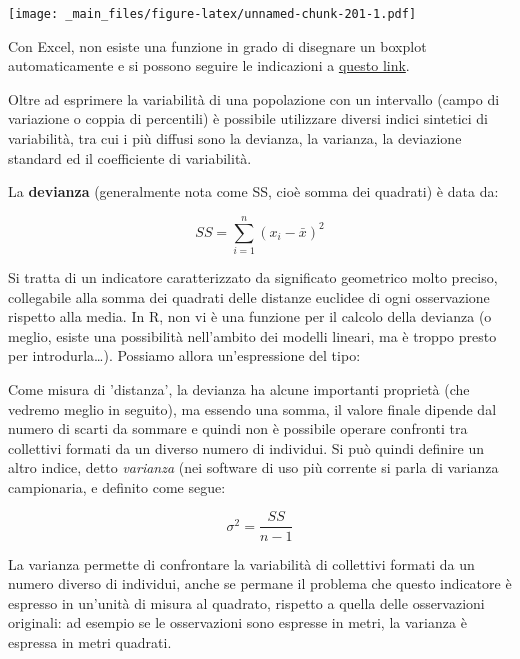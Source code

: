 \documentclass[a4paper,12pt,oneside]{book}
\newenvironment{Shaded}{\begin{snugshade}}{\end{snugshade}}
\newcommand{\KeywordTok}[1]{\textcolor[rgb]{0.13,0.29,0.53}{\textbf{#1}}}
\newcommand{\DecValTok}[1]{\textcolor[rgb]{0.00,0.00,0.81}{#1}}
\newcommand{\StringTok}[1]{\textcolor[rgb]{0.31,0.60,0.02}{#1}}
\newcommand{\OperatorTok}[1]{\textcolor[rgb]{0.81,0.36,0.00}{\textbf{#1}}}
\newcommand{\NormalTok}[1]{#1}
\theoremstyle{definition}
\theoremstyle{definition}
\theoremstyle{definition}
\theoremstyle{remark}
\begin{document}
\texttt{[image: \_main\_files/figure-latex/unnamed-chunk-201-1.pdf]}

Con Excel, non esiste una funzione in grado di disegnare un boxplot
automaticamente e si possono seguire le indicazioni a
\href{http://www.dummies.com/how-to/content/boxandwhisker-charts-for-excel.html}{questo
link}.

Oltre ad esprimere la variabilità di una popolazione con un intervallo
(campo di variazione o coppia di percentili) è possibile utilizzare
diversi indici sintetici di variabilità, tra cui i più diffusi sono la
devianza, la varianza, la deviazione standard ed il coefficiente di
variabilità.

La \textbf{devianza} (generalmente nota come SS, cioè somma dei
quadrati) è data da:

\[SS = \sum\limits_{i = 1}^n {(x_i  - \bar x)^2 }\]

Si tratta di un indicatore caratterizzato da significato geometrico
molto preciso, collegabile alla somma dei quadrati delle distanze
euclidee di ogni osservazione rispetto alla media. In R, non vi è una
funzione per il calcolo della devianza (o meglio, esiste una possibilità
nell'ambito dei modelli lineari, ma è troppo presto per
introdurla\ldots{}). Possiamo allora un'espressione del tipo:

\begin{Shaded}
\end{Shaded}

Come misura di 'distanza', la devianza ha alcune importanti proprietà
(che vedremo meglio in seguito), ma essendo una somma, il valore finale
dipende dal numero di scarti da sommare e quindi non è possibile operare
confronti tra collettivi formati da un diverso numero di individui. Si
può quindi definire un altro indice, detto \emph{varianza} (nei software
di uso più corrente si parla di varianza campionaria, e definito come
segue:

\[\sigma^2  = \frac{SS}{n - 1}\]

La varianza permette di confrontare la variabilità di collettivi formati
da un numero diverso di individui, anche se permane il problema che
questo indicatore è espresso in un'unità di misura al quadrato, rispetto
a quella delle osservazioni originali: ad esempio se le osservazioni
sono espresse in metri, la varianza è espressa in metri quadrati.
\end{document}

